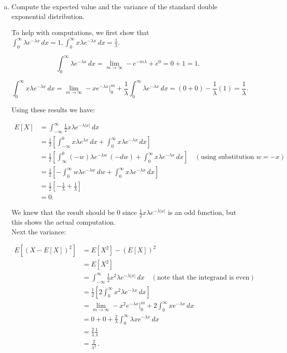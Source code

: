 \documentclass[letterpaper,12pt,fleqn]{article}
\begin{document}
\begin{enumerate}
\begin{enumerate}[a)]
\item Compute the expected value and the variance of the standard double exponential distribution.

To help with computations, we first show that $\int_{0}^{\infty} \lambda e^{-\lambda x} \,dx = 1, \int_{0}^{\infty} x\lambda e^{-\lambda x} \,dx = \frac{1}{\lambda}$.

$$\int_{0}^{\infty} \lambda e^{-\lambda x} \, dx = \lim_{m\to\infty} - e^{-m\lambda} + e^0 = 0 + 1 = 1.$$

$$\int_{0}^{\infty} x\lambda e^{-\lambda x} \, dx = \lim_{m\to\infty} -xe^{-\lambda x} \rvert_{0}^{m} +\frac{1}{\lambda} \int_{0}^{\infty} \lambda e^{-\lambda x} \, dx = (0+0)-\frac{1}{\lambda} (1) = \frac{1}{\lambda}.$$

Using these results we have:

\begin{align*}
E[X] &= \int_{-\infty}^{\infty} \frac{1}{2} x\lambda e^{-\lambda |x|} \, dx \\
&=\frac{1}{2}\left[\int_{-\infty}^{0} x\lambda e^{\lambda x} \, dx + \int_{0}^{\infty} x\lambda e^{-\lambda x} \, dx\right] \\
&=\frac{1}{2}\left[\int_{\infty}^{0} (-w)\lambda e^{-\lambda w} \, (-dw) + \int_{0}^{\infty} x\lambda e^{-\lambda x} \, dx\right] \quad (\text{using substitution } w = -x ) \\
&= \frac{1}{2}\left[-\int_{0}^{\infty} w\lambda e^{-\lambda w} \, dw +\int_{0}^{\infty} x\lambda e^{-\lambda x} \, dx\right] \\
&= \frac{1}{2} \left[ -\frac{1}{\lambda} + \frac{1}{\lambda} \right] \\
&= 0.
\end{align*}

We knew that the result should be 0 since $\frac{1}{2} x \lambda e^{-\lambda |x|}$ is an odd function, but this shows the actual computation. \\

Next the variance:

\begin{align*}
E[(X-E[X])^2] &= E[X^2] - (E[X])^2\\ &= E[X^2] \\
&= \int_{-\infty}^{\infty} \frac{1}{2} x^2 \lambda e^{-\lambda |x|} \, dx \quad (\text{note that the integrand is even})\\
&= \frac{1}{2}\left[2\int_{0}^{\infty}x^2\lambda e^{-\lambda x} \, dx \right] \\
&= \lim_{m\to\infty} -x^2e^{-\lambda x} \rvert_{0}^{m} + 2\int_{0}^{\infty} xe^{-\lambda x} \, dx \\
&= 0 + 0 + \frac{2}{\lambda}\int_{0}^{\infty} \lambda xe^{-\lambda x} \, dx \\
&= \frac{2}{\lambda} \frac{1}{\lambda} \\
&= \frac{2}{\lambda^2} \,.
\end{align*}


\end{enumerate}
\end{enumerate}
\end{document}
